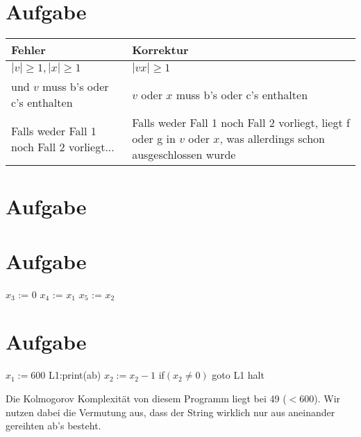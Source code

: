 \documentclass{article}
\begin{document}
\section{Aufgabe}
\begin{tabularx}{\textwidth}{X|X}
Fehler & Korrektur \\
\hline
$|v|\geq 1, |x| \geq 1$ & $|vx| \geq 1$\\
und $v$ muss b's oder c's enthalten & $v$ oder $x$ muss b's oder c's enthalten\\
Falls weder Fall 1 noch Fall 2 vorliegt... & Falls weder Fall 1 noch Fall 2 vorliegt, liegt f oder g in $v$ oder $x$, was allerdings schon ausgeschlossen wurde
\end{tabularx}

\section{Aufgabe}

\section{Aufgabe}
\begin{algorithm}
$x_3$ := 0\;
$x_4$ := $x_1$\;
$x_5$ := $x_2$\;
\end{algorithm}

\section{Aufgabe}
\begin{algorithm}
\DontPrintSemicolon
$x_1:=600$\;
L1:print(ab)\;
$x_2:=x_2-1$\;
if$(x_2\neq0)$ goto L1\;
halt\;
\end{algorithm}
Die Kolmogorov Komplexität von diesem Programm liegt bei 49 ($<600$). Wir nutzen dabei die Vermutung aus, dass der String wirklich nur aus aneinander gereihten ab's besteht.
\end{document}
